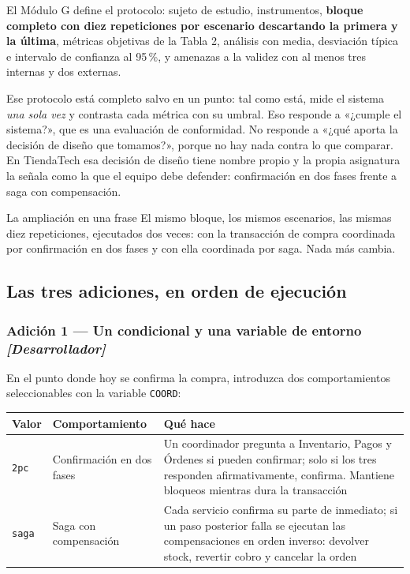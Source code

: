 \documentclass[11pt,a4paper]{article}
\begin{document}
El Módulo G define el protocolo: sujeto de estudio, instrumentos, \textbf{bloque completo con diez repeticiones por escenario descartando la primera y la última}, métricas objetivas de la Tabla 2, análisis con media, desviación típica e intervalo de confianza al 95\,\%, y amenazas a la validez con al menos tres internas y dos externas.

Ese protocolo está completo salvo en un punto: tal como está, mide el sistema \emph{una sola vez} y contrasta cada métrica con su umbral. Eso responde a «¿cumple el sistema?», que es una evaluación de conformidad. No responde a «¿qué aporta la decisión de diseño que tomamos?», porque no hay nada contra lo que comparar. En TiendaTech esa decisión de diseño tiene nombre propio y la propia asignatura la señala como la que el equipo debe defender: confirmación en dos fases frente a saga con compensación.

\begin{uteqbox}{La ampliación en una frase}
	El mismo bloque, los mismos escenarios, las mismas diez repeticiones, ejecutados dos veces: con la transacción de compra coordinada por confirmación en dos fases y con ella coordinada por saga. Nada más cambia.
\end{uteqbox}

\subsection{Las tres adiciones, en orden de ejecución}

\subsubsection{Adición 1 --- Un condicional y una variable de entorno \emph{[Desarrollador]}}

En el punto donde hoy se confirma la compra, introduzca dos comportamientos seleccionables con la variable \texttt{COORD}:

\begin{center}
	\small
	\begin{tabular}{@{}p{1.4cm}p{4.0cm}p{9.6cm}@{}}
		\toprule
		\textbf{Valor} & \textbf{Comportamiento} & \textbf{Qué hace} \\
		\midrule
		\texttt{2pc} & Confirmación en dos fases & Un coordinador pregunta a Inventario, Pagos y Órdenes si pueden confirmar; solo si los tres responden afirmativamente, confirma. Mantiene bloqueos mientras dura la transacción \\
		\addlinespace
		\texttt{saga} & Saga con compensación & Cada servicio confirma su parte de inmediato; si un paso posterior falla se ejecutan las compensaciones en orden inverso: devolver stock, revertir cobro y cancelar la orden \\
		\bottomrule
	\end{tabular}
\end{center}
\end{document}
